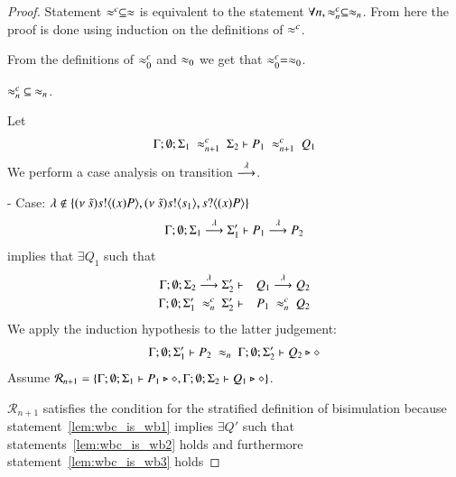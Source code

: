\begin{proof}
	Statement $\approx^{c} \subseteq \approx$
	is equivalent to the statement $\forall n, \approx^{c}_n \subseteq \approx_n$.
	From here the proof is done using induction on the definitions of $\approx^{c}$.

	From the definitions of $\approx^{c}_0$ and $\approx_0$ we get that $\approx^{c}_0 = \approx_0$.

	$\approx^{c}_n\ \subseteq\ \approx_n$.

	Let
%
	\begin{eqnarray*}
		\Gamma; \emptyset; \Sigma_1\ \wbc_{n+1}\ \Sigma_2 \proves P_1\ \wbc_{n+1}\ Q_1
	\end{eqnarray*}
%
	\noi We perform a case analysis on transition $\stackrel{\lambda}{\longrightarrow}$.


	\noi - Case: $\lambda \notin \{(\nu\ \tilde{s}) s ! \langle (x)P \rangle, (\nu\ \tilde{s}) s ! \langle s_1 \rangle, s ? \langle (x)P \rangle\}$
%
	\begin{eqnarray}
		\Gamma; \emptyset; \Sigma_1 \stackrel{\lambda}{\longrightarrow} \Sigma_1' \vdash P_1 \stackrel{\lambda}{\longrightarrow} P_2 \label{lem:wbc_is_wb1}
	\end{eqnarray}
%
	\noi implies that 
	$\exists Q_1$ such that
%
	\begin{eqnarray}
		\Gamma; \emptyset; \Sigma_2 \stackrel{\lambda}{\longrightarrow} \Sigma_2' &\vdash& Q_1 \stackrel{\lambda}{\longrightarrow} Q_2 \label{lem:wbc_is_wb2}\\
		\Gamma; \emptyset; \Sigma_1'\ \approx^{c}_n\ \Sigma_2' &\vdash& P_1\ \approx^{c}_n\ Q_2
	\end{eqnarray}
%
	We apply the induction hypothesis to the latter judgement:
%
	\begin{eqnarray}
		\Gamma; \emptyset; \Sigma_1' \vdash P_2\ \approx_n\ \Gamma; \emptyset; \Sigma_2' \vdash Q_2 \triangleright \diamond  \label{lem:wbc_is_wb3}
	\end{eqnarray}
%
	Assume $\mathcal{R}_{n+1} = \{\Gamma; \emptyset; \Sigma_1 \vdash P_1 \triangleright \diamond, \Gamma; \emptyset; \Sigma_2 \vdash Q_1 \triangleright \diamond\}$.

	\noi $\mathcal{R}_{n+1}$ satisfies the condition for the stratified definition of bisimulation
	because statement~\ref{lem:wbc_is_wb1} implies $\exists Q'$ such that
	statements~\ref{lem:wbc_is_wb2} holds and furthermore statement~\ref{lem:wbc_is_wb3} holds


\end{proof}
